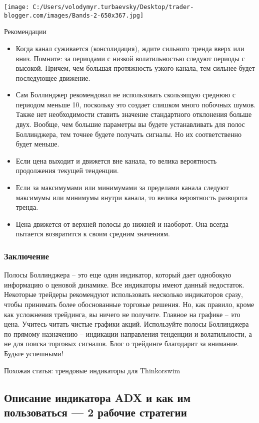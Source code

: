 \documentclass[a5paper]{article}
\begin{document}
\texttt{[image: C:/Users/volodymyr.turbaevsky/Desktop/trader-blogger.com/images/Bands-2-650x367.jpg]}

Рекомендации
\begin{itemize}
\item     Когда канал суживается (консолидация), ждите сильного тренда вверх или вниз. Помните: за периодами с низкой волатильностью следуют периоды с высокой. Причем, чем большая протяжность узкого канала, тем сильнее будет последующее движение.
\item     Сам Боллинджер рекомендовал не использовать скользящую среднюю с периодом меньше 10, поскольку это создает слишком много побочных шумов. Также нет необходимости ставить значение стандартного отклонения больше двух. Вообще, чем большие параметры вы будете устанавливать для полос Боллинджера, тем точнее будете получать сигналы. Но их соответственно будет меньше.
\item     Если цена выходит и движется вне канала, то велика вероятность продолжения текущей тенденции.
\item     Если за максимумами или минимумами за пределами канала следуют максимумы или минимумы внутри канала, то велика вероятность разворота тренда.
\item     Цена движется от верхней полосы до нижней и наоборот. Она всегда пытается возвратится к своим средним значениям.
\end{itemize}

\subsubsection{Заключение}

Полосы Боллинджера – это еще один индикатор, который дает однобокую информацию о ценовой динамике. Все индикаторы имеют данный недостаток. Некоторые трейдеры рекомендуют использовать несколько индикаторов сразу, чтобы принимать более обоснованные торговые решения. Но, как правило, кроме как усложнения трейдинга, вы ничего не получите. Главное на графике – это цена. Учитесь читать чистые графики акций. Используйте полосы Боллинджера по прямому назначению – индикации направления тенденции и волатильности, а не для поиска торговых сигналов. Блог о трейдинге благодарит за внимание. Будьте успешными!


Похожая статья: трендовые индикаторы для Thinkorswim

\subsection{Описание индикатора ADX и как им пользоваться — 2 рабочие
  стратегии}
\end{document}
